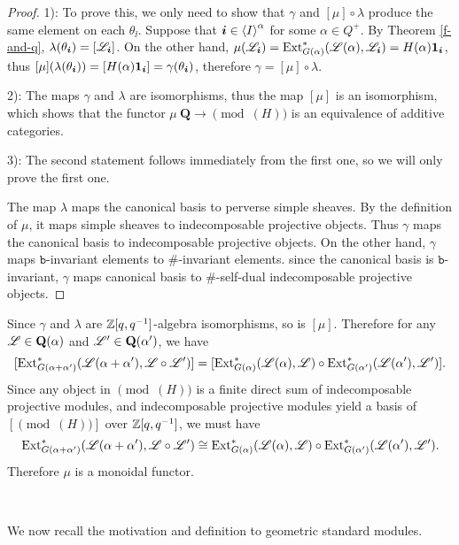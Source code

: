 \begin{proof}
    1): To prove this, we only need to show that $\gamma$ and $[\mu]\circ\lambda$ produce
    the same element on each $\theta_{\ii}$. Suppose that
    $\boldsymbol{i}\in\left<I\right>^\alpha$ for some $\alpha\in Q^+$. By 
    Theorem \ref{f-and-q}, $\lambda(\theta_{\boldsymbol{i}})
     = [\mathscr{L}_{\boldsymbol{i}}]$. On the other hand, $\mu(\mathscr{L}_{\boldsymbol{i}})
     = \operatorname{Ext}^*_{G(\alpha)}(\mathscr{L}(\alpha),\mathscr{L}_{\boldsymbol{i}}) = H(\alpha)\mathbf{1}_{\boldsymbol{i}}$,
    thus $[\mu](\lambda(\theta_{\boldsymbol{i}})) = [H(\alpha)\mathbf{1}_{\boldsymbol{i}}] = 
    \gamma(\theta_{\boldsymbol{i}})$, therefore $\gamma = [\mu]\circ\lambda$.

    2): The maps $\gamma$ and $\lambda$ are isomorphisms,
    thus the map $[\mu]$ is an isomorphism, which shows that 
    the functor $\mu\:\mathbf{Q}\to\pmod(H)$ is an equivalence of additive categories.

    3): The second statement follows immediately from the first one,
    so we will only prove the first one.    

    The map $\lambda$ maps the canonical basis
    to perverse simple sheaves. By the definition of $\mu$,
    it maps simple sheaves to indecomposable projective objects.
    Thus $\gamma$ maps the canonical basis to indecomposable
    projective objects. On the other hand, $\gamma$ maps
    $\mathtt{b}$-invariant elements to $\#$-invariant elements.
    since the canonical basis is $\mathtt{b}$-invariant, $\gamma$
    maps canonical basis to $\#$-self-dual indecomposable
    projective objects.
\end{proof}

\begin{remark}
    Since $\gamma$ and $\lambda$ are $\mathbb{Z}[q,q^{-1}]$-algebra
    isomorphisms, so is $[\mu]$. Therefore for any $\mathscr{L}\in
    \mathbf{Q}(\alpha)$ and $\mathscr{L}'\in\mathbf{Q}(\alpha')$,
    we have $$[\operatorname{Ext}_{G(\alpha+\alpha')}^*(\mathscr{L}(\alpha+\alpha'),\mathscr{L}\circ\mathscr{L}')]
     = [\operatorname{Ext}_{G(\alpha)}^*(\mathscr{L}(\alpha),\mathscr{L})\circ\operatorname{Ext}_{G(\alpha')}^*(\mathscr{L}(\alpha'),\mathscr{L}')].$$
    Since any object in $\pmod(H)$ is a finite direct sum
    of indecomposable projective modules, and 
    indecomposable projective modules yield a basis
    of $[\pmod(H)]$ over $\mathbb{Z}[q,q^{-1}]$, we must have
    \[
        \operatorname{Ext}_{G(\alpha+\alpha')}^*(\mathscr{L}(\alpha+\alpha'),\mathscr{L}\circ\mathscr{L}')
        \cong\operatorname{Ext}_{G(\alpha)}^*(\mathscr{L}(\alpha),\mathscr{L})\circ\operatorname{Ext}_{G(\alpha')}^*(\mathscr{L}(\alpha'),\mathscr{L}').
    \]
    Therefore $\mu$ is a monoidal functor.
\end{remark}

\ 

We now recall the motivation and definition to geometric standard modules.


